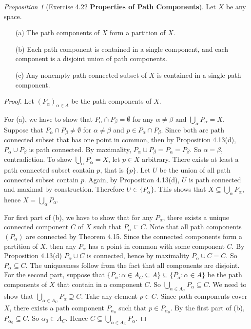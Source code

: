 \documentclass[a4paper]{article}
\theoremstyle{remark}
\newtheorem{prop}{Proposition}
\newcommand{\subhim}{\subseteq} %
\begin{document}
\begin{prop}[Exercise 4.22 \textbf{Properties of Path Components}]
	Let $X$ be any space.
	\begin{enumerate}[nolistsep]
		\item[(a)] The path components of $X$ form a partition of $X$.
		\item [(b)] Each path component is contained in a single component, and each component is a disjoint union of path components.
		\item [(c)] Any nonempty path-connected subset of $X$ is contained in a single path component.
	\end{enumerate}
\end{prop}
\begin{proof}
	Let $(P_{\alpha})_{\alpha \in A}$ be the path components of $X$. 
	
	For (a), we have to show that $P_{\alpha} \cap P_{\beta} = \emptyset$ for any $\alpha \neq \beta$ and $\bigcup_{\alpha} P_{\alpha} = X$. Suppose that $P_{\alpha} \cap P_{\beta}\neq \emptyset$ for $\alpha \neq \beta$ and $p \in P_{\alpha} \cap P_{\beta}$. Since both are path connected subset that has one point in common, then by Proposition 4.13(d), $P_{\alpha} \cup P_{\beta}$ is path connected. By maximality, $P_{\alpha} \cup P_{\beta} = P_{\alpha} = P_{\beta}$. So $\alpha = \beta$, contradiction. To show $\bigcup_{\alpha} P_{\alpha} = X$, let $p \in X$ arbitrary. There exists at least a path connected  subset contain $p$, that is $\{p\}$. Let $U$ be the union of all path connected subset contain $p$. Again, by Proposition 4.13(d), $U$ is path connected and maximal by construction. Therefore $U\in \{P_{\alpha}\}$. This shows that $X \subhim \bigcup_{\alpha} P_{\alpha}$, hence $X = \bigcup_{\alpha} P_{\alpha}$.   
	
	For first part of (b), we have to show that for any $P_{\alpha}$, there exists a unique connected component $C$ of $X$ such that $P_{\alpha} \subhim C$. Note that all path components $(P_{\alpha})$ are connected by Theorem 4.15. Since the connected components form a partition of $X$, then any $P_{\alpha}$ has a point in common with some component $C$. By Proposition 4.13(d) $P_{\alpha} \cup C$ is connected, hence by maximality $P_{\alpha} \cup C=C$. So $P_{\alpha} \subhim C$. The uniqueeness follow from the fact that all components are disjoint. For the second part, suppose that $\{P_{\alpha}:\alpha \in A_C\subseteq A \} \subseteq \{P_{\alpha}: \alpha \in A \}$ be the path components of $X$ that contain in a component $C$. So $\bigcup_{\alpha \in A_C} P_{\alpha} \subhim C$. We need to show that $\bigcup_{\alpha \in A_C} P_{\alpha} \supseteq C$. Take any element $p \in C$. Since path components cover $X$, there exists a path component $P_{\alpha_0}$ such that $p \in P_{\alpha_0}$. By the first part of (b), $P_{\alpha_0} \subhim C$. So $\alpha_0 \in A_C$. Hence $C \subhim \bigcup_{\alpha \in A_C} P_{\alpha}$.
	

\end{proof}
\end{document}
